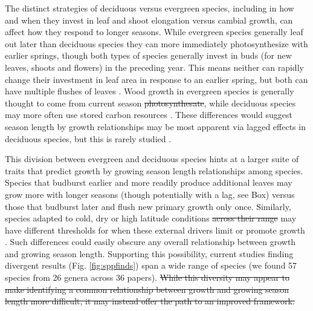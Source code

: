 \documentclass[11pt]{article}
\newcommand{\R}[1]{\label{#1}\linelabel{#1}}
\providecommand{\DIFaddtex}[1]{{\protect\color{blue}\uwave{#1}}} %
\providecommand{\DIFdeltex}[1]{{\protect\color{red}\sout{#1}}}                      %
\providecommand{\DIFaddbegin}{} %
\providecommand{\DIFaddend}{} %
\providecommand{\DIFdelbegin}{} %
\providecommand{\DIFdelend}{} %
\providecommand{\DIFadd}[1]{\texorpdfstring{\DIFaddtex{#1}}{#1}} %
\providecommand{\DIFdel}[1]{\texorpdfstring{\DIFdeltex{#1}}{}} %
\newcommand{\DIFscaledelfig}{0.5}
\newlength{\DIFdelgraphicswidth} %
\newlength{\DIFdelgraphicsheight} %
\newcommand{\DIFaddincludegraphics}[2][]{{\color{blue}\fbox{\DIFOincludegraphics[#1]{#2}}}} %
\newcommand{\DIFdelincludegraphics}[2][]{%
\sbox{\DIFdelgraphicsbox}{\DIFOincludegraphics[#1]{#2}}%
\settoboxwidth{\DIFdelgraphicswidth}{\DIFdelgraphicsbox} %
\settoboxtotalheight{\DIFdelgraphicsheight}{\DIFdelgraphicsbox} %
\scalebox{\DIFscaledelfig}{%
\parbox[b]{\DIFdelgraphicswidth}{\usebox{\DIFdelgraphicsbox}\\[-\baselineskip] \rule{\DIFdelgraphicswidth}{0em}}\llap{\resizebox{\DIFdelgraphicswidth}{\DIFdelgraphicsheight}{%
\setlength{\unitlength}{\DIFdelgraphicswidth}%
\begin{picture}(1,1)%
\thicklines\linethickness{2pt} %
{\color[rgb]{1,0,0}\put(0,0){\framebox(1,1){}}}%
{\color[rgb]{1,0,0}\put(0,0){\line( 1,1){1}}}%
{\color[rgb]{1,0,0}\put(0,1){\line(1,-1){1}}}%
\end{picture}%
}\hspace*{3pt}}} %
} %
\DeclareRobustCommand{\DIFaddbegin}{\DIFOaddbegin \let\includegraphics\DIFaddincludegraphics} %
\DeclareRobustCommand{\DIFaddend}{\DIFOaddend \let\includegraphics\DIFOincludegraphics} %
\DeclareRobustCommand{\DIFdelbegin}{\DIFOdelbegin \let\includegraphics\DIFdelincludegraphics} %
\DeclareRobustCommand{\DIFdelend}{\DIFOaddend \let\includegraphics\DIFOincludegraphics} %
\begin{document}
The distinct strategies of deciduous versus evergreen species, including in how and when they invest in leaf and shoot elongation versus cambial growth, can affect how they respond to longer seasons. While evergreen species generally leaf out later than deciduous species they can more immediately photosynthesize with earlier springs, though both types of species generally invest in buds (for new leaves, shoots and flowers) in the preceding year. This means neither can rapidly change their investment in leaf area in response to an earlier spring, but both can have multiple flushes of leaves \citep{day2011regulation,soolanayakanahally2013timing}. Wood growth in evergreen species is generally thought to come from current season \DIFdelbegin \DIFdel{photosynthesate}\DIFdelend \DIFaddbegin \DIFadd{photosynthates}\DIFaddend , while deciduous species may more often use stored carbon resources \citep{gordon1968seasonal,monson2018finding}. These differences would suggest season length by growth relationships
may be most apparent via lagged effects in deciduous species, but this is rarely studied  \citep[and not clearly supported to date, see][]{coulthard2020limits,klesse2023legacy}. %

\DIFdelbegin %
\DIFdelend This division between evergreen and deciduous species hints at a larger suite of traits that predict growth by growing season length relationships among species. Species that budburst earlier and more readily produce additional leaves \citep[e.g. leaf flushes after budset, and other characteristics more common to `indeterminate' species,][]{kikuzawa1982leaf,Lechowicz:1984cr} may grow more with longer seasons (though potentially with a lag, see Box) \DIFdelbegin %
\DIFdelend versus those that budburst later and flush new primary growth only once. Similarly, species adapted to cold, dry or high latitude conditions \DIFdelbegin \DIFdel{across their range }\DIFdelend may have different thresholds for when these external drivers limit or promote growth \citep[e.g. some \emph{Populus} and \emph{Quercus} species,][and see Fig.\ref{fig:moraconcept}]{soolanayakanahally2013timing,mckown2016impacts,delpierre2017tree,de2022temperature}. Such differences could easily obscure any overall relationship between growth and growing season length. Supporting this possibility, current studies finding divergent results (Fig. \ref{fig:sppfinds}) span a wide range of species (we found  57 species from 26 genera across 36 papers). 
\DIFdelbegin \DIFdel{While this diversity may appear to make identifying a common relationship between growth and growing season length more difficult, it may instead offer the path to an improved framework.}%
\DIFdelend 
\end{document}
